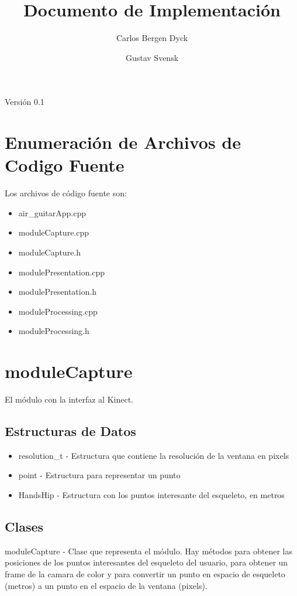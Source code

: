 \documentclass[a4paper,10pt]{article}
\title{Documento de Implementación}
\author{Carlos Bergen Dyck \and Gustav Svensk}
\begin{document}
\renewcommand{\arraystretch}{1.5}
\maketitle
\begin{center}
        {\large Versión 0.1}
\end{center}
\newpage
\section{Enumeración de Archivos de Codigo Fuente}
Los archivos de código fuente son:
\begin{itemize}
\item{air\_guitarApp.cpp}
\item{moduleCapture.cpp}
\item{moduleCapture.h}
\item{modulePresentation.cpp}
\item{modulePresentation.h}
\item{moduleProcessing.cpp}
\item{moduleProcessing.h}
\end{itemize}

\section{moduleCapture}
\label{sec:captura}
El módulo con la interfaz al Kinect.
\subsection{Estructuras de Datos}
\begin{itemize}
\item{resolution\_t - Estructura que contiene la resolución de la ventana en pixels}
\item{point - Estructura para representar un punto}
\item{HandsHip - Estructura con los puntos interesante del esqueleto, en metros}
\end{itemize}
\subsection{Clases}
moduleCapture - Clase que representa el módulo.
Hay métodos para obtener las posiciones de los puntos interesantes del esqueleto del 
usuario, para obtener un frame de la camara de color y para convertir un punto en espacio de
esqueleto (metros) a un punto en el espacio de la ventana (pixels).
\end{document}
